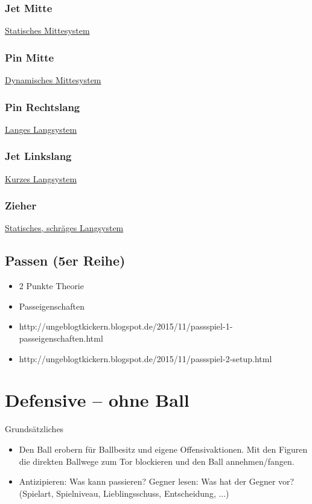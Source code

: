 \subsubsection{Jet Mitte}
\href{http://ungeblogtkickern.blogspot.de/2015/06/system-jet-mitte.htmli}{
Statisches Mittesystem}
\subsubsection{Pin Mitte}
\href{http://ungeblogtkickern.blogspot.de/2015/08/system-pin-mitte.html}{
Dynamisches Mittesystem}
\subsubsection{Pin Rechtslang}
\href{http://ungeblogtkickern.blogspot.de/2015/07/system-pin-rechtslang.html}{
Langes Langsystem}
\subsubsection{Jet Linkslang}
\href{http://ungeblogtkickern.blogspot.de/2015/07/system-jet-linkslang.html}{
Kurzes Langsystem}
\subsubsection{Zieher}
\href{http://ungeblogtkickern.blogspot.de/2015/09/system-zieher.html}{
Statisches, schräges Langsystem}

 
\subsection{Passen (5er Reihe)}
\label{taktik:offensive:sturm}

\begin{itemize}
\item 2 Punkte Theorie
\item Passeigenschaften
\item http://ungeblogtkickern.blogspot.de/2015/11/passspiel-1-passeigenschaften.html
\item http://ungeblogtkickern.blogspot.de/2015/11/passspiel-2-setup.html
\end{itemize}


\section{Defensive -- ohne Ball}
\label{taktik:defensive}

Grundsätzliches
\begin{itemize}
\item Den Ball erobern für Ballbesitz und eigene Offensivaktionen. Mit den Figuren die direkten Ballwege zum Tor blockieren und den Ball annehmen/fangen. 
\item Antizipieren: Was kann passieren? Gegner lesen: Was hat der Gegner vor? (Spielart, Spielniveau, Lieblingsschuss, Entscheidung, ...)
\end{itemize}

